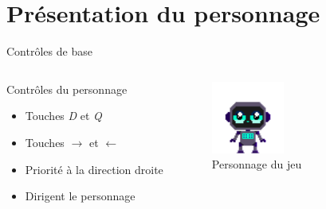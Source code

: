 \documentclass{beamer}
\begin{document}
{\section{Présentation du personnage}
\begin{frame}{Contrôles de base}
    \begin{columns}
            \begin{block}{Contrôles du personnage}
                \begin{itemize}
                    \item[\bullet] Touches \emph{D} et \emph{Q}
                    \item[\bullet] Touches $\rightarrow$ et $\leftarrow$
                    \item[\bullet] Priorité à la direction droite
                    \item[\bullet] Dirigent le personnage
                \end{itemize}
            \end{block}
            \begin{figure}
                \centering
                \includegraphics[width=0.8\textwidth]{images/character_placeholder.png}
                \caption{Personnage du jeu}
            \end{figure}
    \end{columns}
\end{frame}

}
\end{document}
